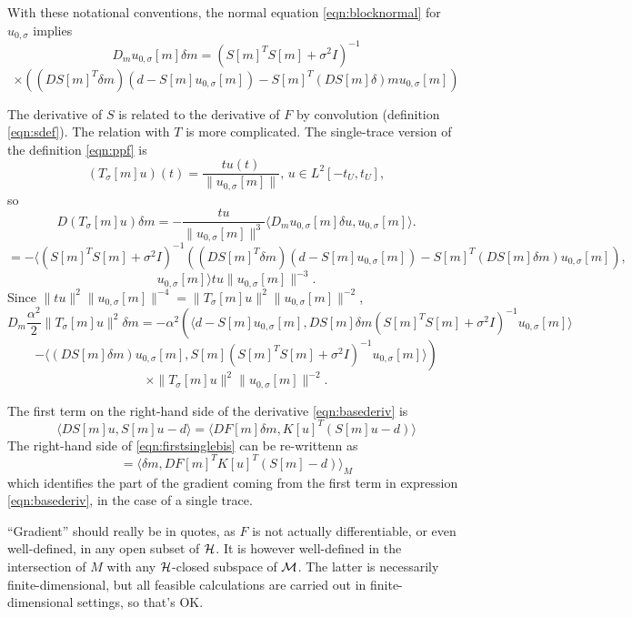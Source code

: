 With these notational conventions, the normal equation \ref{eqn:blocknormal} for $u_{0,\sigma}$ implies
\[
  D_mu_{0,\sigma}[m] \delta m = (S[m]^TS[m] + \sigma^2I)^{-1}
\]
\begin{equation}
  \label{eqn:blockderiv}
  \times ((DS[m]^{T}\delta m) (d - S[m]u_{0,\sigma}[m]) - S[m]^T(DS[m]\delta) m u_{0,\sigma}[m])
\end{equation}

The derivative of $S$ is related to the derivative of $F$ by convolution (definition \ref{eqn:sdef}). The relation with $T$ is more complicated.
The single-trace version of the definition \ref{eqn:ppf} is
\[
  (T_{\sigma}[m]u)(t) = \frac{t u(t)}{\|u_{0,\sigma}[m]\|},\,u \in L^2[-t_U,t_U],
\]
so
\[
D(T_{\sigma}[m] u)\delta m = -\frac{t u}{\|u_{0,\sigma}[m]\|^3}\langle D_mu_{0,\sigma}[m]\delta u, u_{0,\sigma}[m]\rangle.
\]
\[
  =-\langle  (S[m]^TS[m] + \sigma^2I)^{-1}((DS[m]^{T}\delta m) (d - S[m]u_{0,\sigma}[m]) - S[m]^T(DS[m]\delta m) u_{0,\sigma}[m]),
\]
\[ u_{0,\sigma}[m] \rangle tu \|u_{0,\sigma}[m] \|^{-3}.
\]
Since $\|tu\|^2\| u_{0,\sigma}[m]\|^{-4} = \|T_{\sigma}[m]u\|^2\| u_{0,\sigma}[m]\|^{-2}$,
\[
  D_m \frac{\alpha^2}{2}\|T_{\sigma}[m]u\|^2\delta m =-\alpha^2\left( \langle d-S[m]u_{0,\sigma}[m], DS[m]\delta m (S[m]^TS[m] + \sigma^2I)^{-1}u_{0,\sigma}[m]\rangle \right.
\]
\[
  \left. - \langle (DS[m]\delta m)u_{0,\sigma}[m],S[m](S[m]^TS[m] + \sigma^2I)^{-1}u_{0,\sigma}[m]\rangle \right)
\]
\begin{equation}
  \label{eqn:penderiv}
  \times  \|T_{\sigma}[m]u\|^2\| u_{0,\sigma}[m]\|^{-2}.
\end{equation}

The first term on the right-hand side of the derivative \ref{eqn:basederiv} is
\begin{equation}
  \label{eqn:firstsinglebis}
  \langle DS[m]u, S[m]u-d\rangle = \langle DF[m]\delta m, K[u]^T(S[m]u-d) \rangle
\end{equation}
The right-hand side of \ref{eqn:firstsinglebis} can be re-writtenn as
\begin{equation}
  \label{eqn:resderiv1}
  = \langle \delta m, DF[m]^TK[u]^T(S[m]-d)\rangle_M
\end{equation}
which identifies the part of the gradient coming from the first term in expression \ref{eqn:basederiv}, in the case of a single trace. 

 ``Gradient'' should really be in quotes, as $F$ is not actually differentiable, or even well-defined, in any open subset of ${\cal H}$. It is however well-defined in the intersection of $M$ with any ${\cal H}$-closed subspace of ${\cal M}$. The latter is necessarily finite-dimensional, but all feasible calculations are carried out in finite-dimensional settings, so that's OK.

